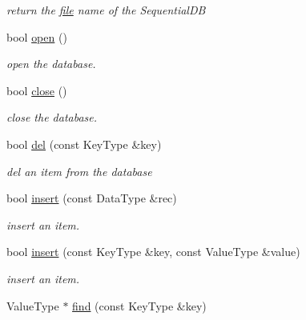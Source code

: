 \begin{CompactItemize}
\begin{CompactList}\small\item\em return the \hyperlink{classfile}{file} name of the SequentialDB \item\end{CompactList}\item 
bool \hyperlink{classsdb__btree_3930f68c0075a965d79dae75586e611d}{open} ()
\begin{CompactList}\small\item\em open the database. \item\end{CompactList}\item 
bool \hyperlink{classsdb__btree_2da914c45fec1081667fb22d42a021a5}{close} ()
\begin{CompactList}\small\item\em close the database. \item\end{CompactList}\item 
\hypertarget{classsdb__btree_30e2c2e7489f8785c86284e09b75bcfb}{
bool \hyperlink{classsdb__btree_30e2c2e7489f8785c86284e09b75bcfb}{del} (const KeyType \&key)}
\label{classsdb__btree_30e2c2e7489f8785c86284e09b75bcfb}

\begin{CompactList}\small\item\em del an item from the database \item\end{CompactList}\item 
\hypertarget{classsdb__btree_3f3988638bc90b19230f5c80dd960dad}{
bool \hyperlink{classsdb__btree_3f3988638bc90b19230f5c80dd960dad}{insert} (const DataType \&rec)}
\label{classsdb__btree_3f3988638bc90b19230f5c80dd960dad}

\begin{CompactList}\small\item\em insert an item. \item\end{CompactList}\item 
\hypertarget{classsdb__btree_1bc062c093b1b5599313bcf33af0820f}{
bool \hyperlink{classsdb__btree_1bc062c093b1b5599313bcf33af0820f}{insert} (const KeyType \&key, const ValueType \&value)}
\label{classsdb__btree_1bc062c093b1b5599313bcf33af0820f}

\begin{CompactList}\small\item\em insert an item. \item\end{CompactList}\item 
\hypertarget{classsdb__btree_42fb2964951af3294e544f857f23349b}{
ValueType $\ast$ \hyperlink{classsdb__btree_42fb2964951af3294e544f857f23349b}{find} (const KeyType \&key)}
\label{classsdb__btree_42fb2964951af3294e544f857f23349b}


\end{CompactItemize}
